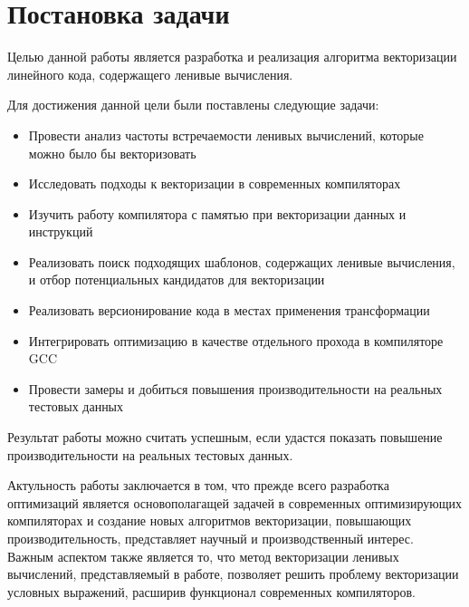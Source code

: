 \section{Постановка задачи}
\label{sec:Chapter1} 


Целью данной работы является разработка и реализация алгоритма векторизации линейного кода, содержащего ленивые вычисления.

Для достижения данной цели были поставлены следующие задачи:

\begin{itemize}
    \item Провести анализ частоты встречаемости ленивых вычислений, которые можно было бы векторизовать
    \item Исследовать подходы к векторизации в современных компиляторах
    \item Изучить работу компилятора с памятью при векторизации данных и инструкций
    \item Реализовать поиск подходящих шаблонов, содержащих ленивые вычисления, и отбор потенциальных кандидатов для векторизации
    \item Реализовать версионирование кода в местах применения трансформации
    \item Интегрировать оптимизацию в качестве отдельного прохода в компиляторе GCC
    \item Провести замеры и добиться повышения производительности на реальных тестовых данных
\end{itemize}

Результат работы можно считать успешным, если удастся показать повышение производительности на реальных тестовых данных. 

Актульность работы заключается в том, что прежде всего разработка оптимизаций является основополагащей задачей в современных оптимизирующих компиляторах и создание новых алгоритмов векторизации, повышающих производительность, представляет научный и производственный интерес. Важным аспектом также является то, что метод векторизации ленивых вычислений, представляемый в работе, позволяет решить проблему векторизации условных выражений, расширив функционал современных компиляторов.
\newpage
